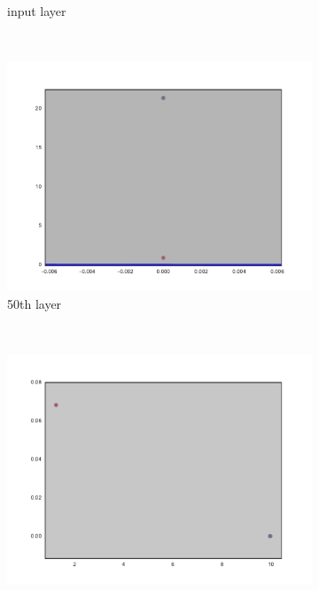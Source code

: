 \begin{figure}
\begin{subfigure}[b]{0.3\textwidth}
        \caption{\ReLUBN input layer}
        \label{fig:reluBNInitInput}
    \end{subfigure}
    ~ %
    \begin{subfigure}[b]{0.3\textwidth}
        \includegraphics[width=\textwidth]{img/init/relu-bn/conv2d_50-0.pdf}
        \caption{\ReLUBN 50th layer}
        \label{fig:reluBNInit501}
    \end{subfigure}
    ~ %
    \begin{subfigure}[b]{0.3\textwidth}
        \includegraphics[width=\textwidth]{img/init/relu-bn/conv2d_50-2.pdf}

\end{subfigure}
\end{figure}
